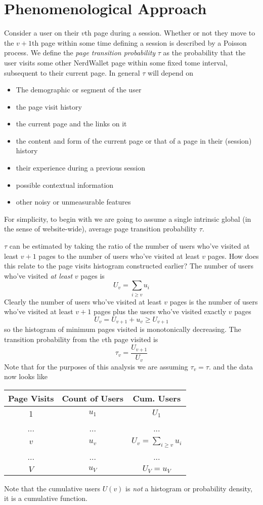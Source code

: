 \documentclass[12pt]{report}
\newcommand{\beq}{\begin{equation}} %
\newcommand{\eeq}{\end{equation}} %
\newcommand{\bdm}{\begin{displaymath}} %
\newcommand{\edm}{\end{displaymath}} %
\newcommand{\bi}{\begin{itemize}} %
\newcommand{\ei}{\end{itemize}} %
\begin{document}
\section{Phenomenological Approach}
Consider a user on their \(v\)th page during a session. Whether or not
they move to the \(v+1\)th page within some time defining a session is
described by a Poisson process. We define the {\em page transition
  probability} \(\tau\) as the probability that the user visits some
other NerdWallet page within some fixed tome interval, subsequent to
their current page. In general \(\tau\) will depend on
\bi
\item The demographic or segment of the user
\item the page visit history
\item the current page and the links on it
\item the content and form of the current page or that of a page in
  their (session) history
\item their experience during a previous session
\item possible contextual information
\item other noisy or unmeasurable features
\ei  
For simplicity, to begin with we are going to assume a single
intrinsic global (in the sense of website-wide), average page
transition probability \(\tau\).

\(\tau\) can be estimated by taking the ratio of the number of users
who've visited at least \(v+1\) pages to the number of users who've
visited at least \(v\) pages. How does this relate to
the page visits histogram constructed earlier? The number of users
who've visited {\em at least} \(v\) pages is
\bdm
U_v = \sum_{i\ge v}u_i
\edm
Clearly the number of users who've
visited at least \(v\) pages is the number of users who've visited at
least \(v+1\) pages plus the users who've visited exactly \(v\) pages
\bdm
U_v = U_{v+1} + u_v \ge U_{v+1}
\edm
so the histogram of minimum
pages visited is monotonically decreasing.  The transition probability
from the \(v\)th page visited is
\beq\label{eq:tau}
\tau_v = \frac{U_{v+1}}{U_v}
\eeq
Note that for the purposes of this analysis
we are assuming \(\tau_v=\tau\).  and the data now looks like
\begin{center}\label{table:cum}
\begin{tabular}{ |c|c|c| } 
 \hline
 Page Visits & Count of Users & Cum. Users \\
 \hline
 1 & \(u_1\) & \(U_1\) \\
 ... & ... & ... \\ 
 \(v\) & \(u_v\) & \(U_v = \sum_{i\ge v}u_i\) \\ 
 ... & ... & ... \\
 \(V\) &\(u_V\) & \(U_V = u_V\) \\
 \hline
\end{tabular}
\end{center}
Note that the cumulative users \(U(v)\) is {\em not} a histogram or
probability density, it is a cumulative function.
\end{document}

